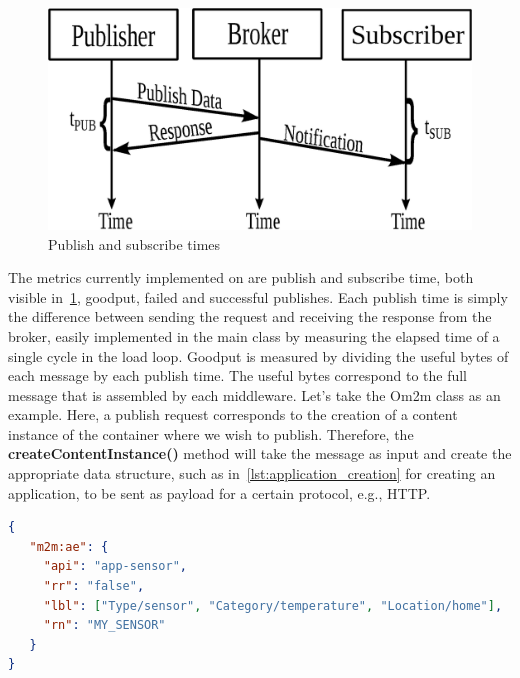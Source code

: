 \documentclass[conference]{IEEEtran}
\begin{document}
\begin{figure}[htbp!]
  \centering
  \includegraphics[width=\linewidth]{figures/pub_sub_time.eps}
  \caption{Publish and subscribe times~\cite{cardoso_benchmarking_2017}}
  \label{fig:pub_sub_time}
\end{figure}

The metrics currently implemented on are publish and subscribe time, both visible in~\ref{fig:pub_sub_time}, goodput, failed and successful publishes. Each publish time is simply the difference between sending the request and receiving the response from the broker, easily implemented in the main class by measuring the elapsed time of a single cycle in the load loop.
Goodput is measured by dividing the useful bytes of each message by each publish time. The useful bytes correspond to the full message that is assembled by each middleware. Let's take the Om2m class as an example. Here, a publish request corresponds to the creation of a content instance of the container where we wish to publish. Therefore, the \textbf{createContentInstance()} method will take the message as input and create the appropriate data structure, such as in~\ref{lst:application_creation} for creating an application, to be sent as payload for a certain protocol, e.g., HTTP\@.

\begin{lstlisting}[linewidth=\columnwidth, caption=JSON payload for application creation, captionpos=b, label=lst:application_creation, language=json]
{
   "m2m:ae": {
     "api": "app-sensor",
     "rr": "false",
     "lbl": ["Type/sensor", "Category/temperature", "Location/home"],
     "rn": "MY_SENSOR"
   }
}
\end{lstlisting}
\end{document}
